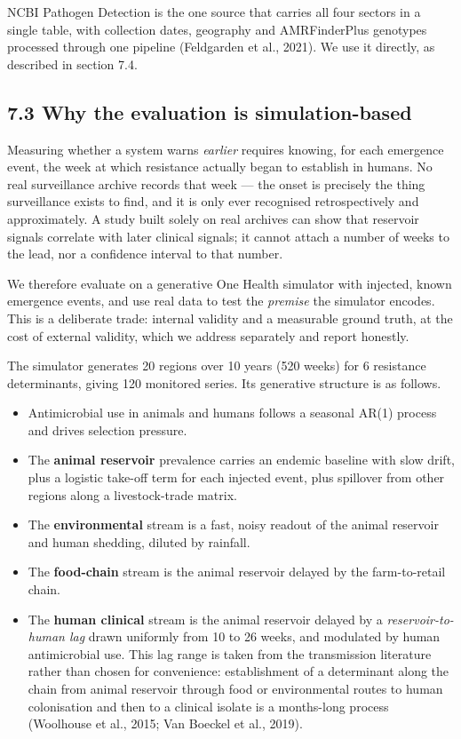 \documentclass[11pt,a4paper]{article}
\begin{document}
NCBI Pathogen Detection is the one source that carries all four sectors in a single table, with collection dates, geography and AMRFinderPlus genotypes processed through one pipeline (Feldgarden et al., 2021). We use it directly, as described in section 7.4.

\subsection*{7.3 Why the evaluation is simulation-based}

Measuring whether a system warns \emph{earlier} requires knowing, for each emergence event, the week at which resistance actually began to establish in humans. No real surveillance archive records that week — the onset is precisely the thing surveillance exists to find, and it is only ever recognised retrospectively and approximately. A study built solely on real archives can show that reservoir signals correlate with later clinical signals; it cannot attach a number of weeks to the lead, nor a confidence interval to that number.

We therefore evaluate on a generative One Health simulator with injected, known emergence events, and use real data to test the \emph{premise} the simulator encodes. This is a deliberate trade: internal validity and a measurable ground truth, at the cost of external validity, which we address separately and report honestly.

The simulator generates 20 regions over 10 years (520 weeks) for 6 resistance determinants, giving 120 monitored series. Its generative structure is as follows.

\begin{itemize}[leftmargin=1.3em,itemsep=2pt]
  \item Antimicrobial use in animals and humans follows a seasonal AR(1) process and drives selection pressure.
  \item The \textbf{animal reservoir} prevalence carries an endemic baseline with slow drift, plus a logistic take-off term for each injected event, plus spillover from other regions along a livestock-trade matrix.
  \item The \textbf{environmental} stream is a fast, noisy readout of the animal reservoir and human shedding, diluted by rainfall.
  \item The \textbf{food-chain} stream is the animal reservoir delayed by the farm-to-retail chain.
  \item The \textbf{human clinical} stream is the animal reservoir delayed by a \emph{reservoir-to-human lag} drawn uniformly from 10 to 26 weeks, and modulated by human antimicrobial use. This lag range is taken from the transmission literature rather than chosen for convenience: establishment of a determinant along the chain from animal reservoir through food or environmental routes to human colonisation and then to a clinical isolate is a months-long process (Woolhouse et al., 2015; Van Boeckel et al., 2019).
\end{itemize}
\end{document}
